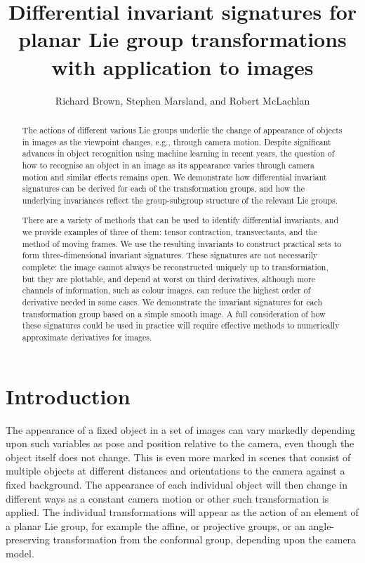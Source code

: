 \documentclass{artjlt}
\title{Differential invariant signatures for planar Lie group transformations with application to images}
\author{Richard Brown, Stephen Marsland, and Robert McLachlan}
\begin{document}
\maketitle
\begin{abstract}
The actions of different various Lie groups underlie the change of appearance of objects in images as the viewpoint changes, e.g., through camera motion. Despite significant advances in object recognition using machine learning in recent years, the question of how to recognise an object in an image as its appearance varies through camera motion and similar effects remains open. We demonstrate how differential invariant signatures can be derived for each of the transformation groups, and how the underlying invariances reflect the group-subgroup structure of the relevant Lie groups. 

There are a variety of methods that can be used to identify differential invariants, and we provide examples of three of them: tensor contraction, transvectants, and the method of moving frames. We use the resulting invariants to construct practical sets to form three-dimensional invariant signatures. These signatures are not necessarily complete: the image cannot always be reconstructed uniquely up to transformation, but they are plottable, and depend at worst on third derivatives, although more channels of information, such as colour images, can reduce the highest order of derivative needed in some cases. We demonstrate the invariant signatures for each transformation group based on a simple smooth image. A full consideration of how these signatures could be used in practice will require effective methods to numerically approximate derivatives for images.
\end{abstract}

\section{Introduction}
The appearance of a fixed object in a set of images can vary markedly depending upon such variables as pose and position relative to the camera, even though the object itself does not change. This is even more marked in scenes that consist of multiple objects at different distances and orientations to the camera against a fixed background. The appearance of each individual object will then change in different ways as a constant camera motion or other such transformation is applied. The individual transformations will appear as the action of an element of a planar Lie group, for example the affine, or projective groups, or an angle-preserving transformation from the conformal group, depending upon the camera model. 
\end{document}
